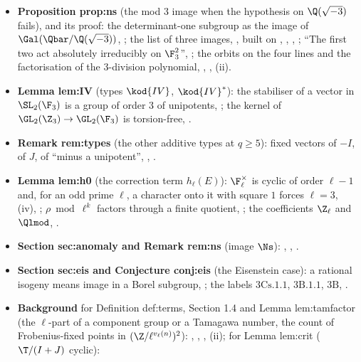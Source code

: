 \begin{itemize}
\item \textbf{Proposition prop:ns} (the mod $3$ image when the hypothesis on $\Q(\sqrt{-3})$ fails), and its proof:
the determinant-one subgroup as the image of $\Gal(\Qbar/\Q(\sqrt{-3}))$, ; the list of three images,
, built on , , , ;
``The first two act absolutely irreducibly on $\F_3^2$'', ; the orbits on the four lines and the factorisation of
the $3$-division polynomial, , , (ii).
\item \textbf{Lemma lem:IV} (types $\kod{IV}$, $\kod{IV}^*$): the stabiliser of a vector in $\SL_2(\F_3)$ is a group of order $3$ of unipotents,
; the kernel of $\GL_2(\Z_3)\to\GL_2(\F_3)$ is torsion-free, .
\item \textbf{Remark rem:types} (the other additive types at $q\ge5$): fixed vectors of $-I$, of $J$, of ``minus a unipotent'',
, .
\item \textbf{Lemma lem:h0} (the correction term $h_\ell(E)$): $\F_\ell^\times$ is cyclic of order $\ell-1$ and, for an odd prime $\ell$, a character onto it with square $1$
forces $\ell=3$, (iv), ; $\rho\bmod\ell^k$ factors through a finite quotient,
; the coefficients $\Z_\ell$ and $\Qlmod$, .
\item \textbf{Section sec:anomaly and Remark rem:ns} (image $\Ns$): , , .
\item \textbf{Section sec:eis and Conjecture conj:eis} (the Eisenstein case): a rational isogeny means image in a Borel subgroup,
; the labels $3\mathrm{Cs}.1.1$, $3\mathrm B.1.1$, $3\mathrm B$, .
\item \textbf{Background} for Definition def:terms, Section 1.4 and Lemma lem:tamfactor (the $\ell$-part of a component group or a
Tamagawa number, the count of Frobenius-fixed points in $(\Z/\ell^{v_\ell(n)})^2$): ,
, , (ii); for Lemma lem:crit ($\T/(I+J)$ cyclic):

\end{itemize}
